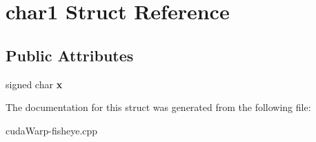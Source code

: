 \hypertarget{structchar1}{}\section{char1 Struct Reference}
\label{structchar1}
\subsection*{Public Attributes}
\begin{DoxyCompactItemize}
\item 
signed char {\bfseries x}\hypertarget{structchar1_adbd74928afc6f4c863a5c3fded2a4a4a}{}\label{structchar1_adbd74928afc6f4c863a5c3fded2a4a4a}

\end{DoxyCompactItemize}


The documentation for this struct was generated from the following file\+:\begin{DoxyCompactItemize}
\item 
cuda\+Warp-\/fisheye.\+cpp\end{DoxyCompactItemize}
